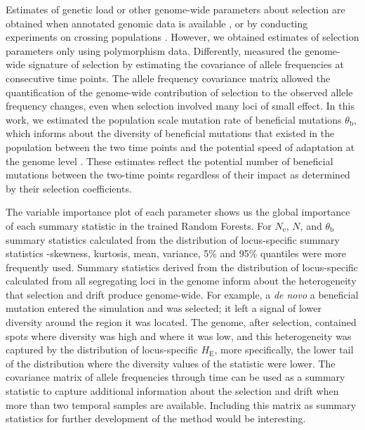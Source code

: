 \documentclass[a4paper, 12pt]{article}
\begin{document}
Estimates of genetic load or other genome-wide parameters about selection are obtained when annotated genomic data is available \citep{Henn:2015ce}, or by conducting experiments on crossing populations \citep[for the genetic load;][]{Plough:2016gw}. However, we obtained estimates of selection parameters only using polymorphism data. Differently, \citet{Buffalo:2020hq} measured the genome-wide signature of selection by estimating the covariance of allele frequencies at consecutive time points. The allele frequency covariance matrix allowed the quantification of the genome-wide contribution of selection to the observed allele frequency changes, even when selection involved many loci of small effect. In this work, we estimated the population scale mutation rate of beneficial mutations $\theta_{\mathrm{b}}$, which informs about the diversity of beneficial mutations that existed in the population between the two time points and the potential speed of adaptation at the genome level \citep{Hermisson:2017hw}. These estimates reflect the potential number of beneficial mutations between the two-time points regardless of their impact as determined by their selection coefficients.

The variable importance plot of each parameter shows us the global importance of each summary statistic in the trained Random Forests. For $N_{\mathrm{e}}$, $N$, and $\theta_{\mathrm{b}}$ summary statistics calculated from the distribution of locus-specific summary statistics -skewness, kurtosis, mean, variance, 5\% and 95\% quantiles were more frequently used. Summary statistics derived from the distribution of locus-specific calculated from all segregating loci in the genome inform about the heterogeneity that selection and drift produce genome-wide. For example, a \textit{de novo} a beneficial mutation entered the simulation and was selected; it left a signal of lower diversity around the region it was located. The genome, after selection, contained spots where diversity was high and where it was low, and this heterogeneity was captured by the distribution of locus-specific $H_{\mathrm{E}}$, more specifically, the lower tail of the distribution where the diversity values of the statistic were lower. The covariance matrix of allele frequencies through time \citep{Buffalo:2020hq} can be used as a summary statistic to capture additional information about the selection and drift when more than two temporal samples are available. Including this matrix as summary statistics for further development of the method would be interesting.
\end{document}
